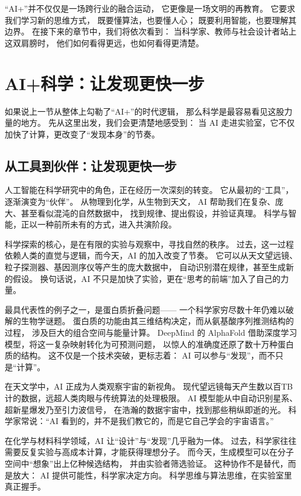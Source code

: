 “AI+”并不仅仅是一场跨行业的融合运动，  
它更像是一场文明的再教育。  
它要求我们学习新的思维方式，  
既要懂算法，也要懂人心；  
既要利用智能，也要理解其边界。  
在接下来的章节中，我们将依次看到：  
当科学家、教师与社会设计者站上这双肩膀时，  
他们如何看得更远，也如何看得更清楚。

\section{AI+科学：让发现更快一步}

如果说上一节从整体上勾勒了“AI+”的时代逻辑，  
那么科学是最容易看见这股力量的地方。  
先从这里出发，我们会更清楚地感受到：  
当 AI 走进实验室，它不仅加快了计算，更改变了“发现本身”的节奏。

\subsection{从工具到伙伴：让发现更快一步}

人工智能在科学研究中的角色，正在经历一次深刻的转变。  
它从最初的“工具”，逐渐演变为“伙伴”。  
从物理到化学，从生物到天文，  
AI 帮助我们在复杂、庞大、甚至看似混沌的自然数据中，  
找到规律、提出假设，并验证真理。  
科学与智能，正以一种前所未有的方式，进入共演阶段。

科学探索的核心，是在有限的实验与观察中，寻找自然的秩序。  
过去，这一过程依赖人类的直觉与逻辑，而今天，AI 的加入改变了节奏。  
它可以从天文望远镜、粒子探测器、基因测序仪等产生的庞大数据中，  
自动识别潜在规律，甚至生成新的假设。  
换句话说，AI 不只是加快了实验，更在“思考的前端”加入了自己的力量。

最具代表性的例子之一，是蛋白质折叠问题——  
一个科学家穷尽数十年仍难以破解的生物学谜题。  
蛋白质的功能由其三维结构决定，而从氨基酸序列推测结构的过程，  
涉及巨大的组合空间与能量计算。  
DeepMind 的 AlphaFold 借助深度学习模型，将这一复杂映射转化为可预测问题，  
以惊人的准确度还原了数十万种蛋白质的结构。  
这不仅是一个技术突破，更标志着：  
AI 可以参与“发现”，而不只是“计算”。

在天文学中，AI 正成为人类观察宇宙的新视角。  
现代望远镜每天产生数以百TB计的数据，远超人类肉眼与传统算法的处理极限。  
AI 模型能从中自动识别星系、超新星爆发乃至引力波信号，  
在浩瀚的数据宇宙中，找到那些稍纵即逝的光。  
科学家常说：“AI 看到的，并不是我们教它的，而是它自己学会的宇宙语言。”

在化学与材料科学领域，AI 让“设计”与“发现”几乎融为一体。  
过去，科学家往往需要反复实验与高成本计算，才能获得理想分子。  
而今天，生成模型可以在分子空间中“想象”出上亿种候选结构，  
并由实验者筛选验证。  
这种协作不是替代，而是放大：  
AI 提供可能性，科学家决定方向。  
科学思维与算法思维，在实验室里真正握手。

